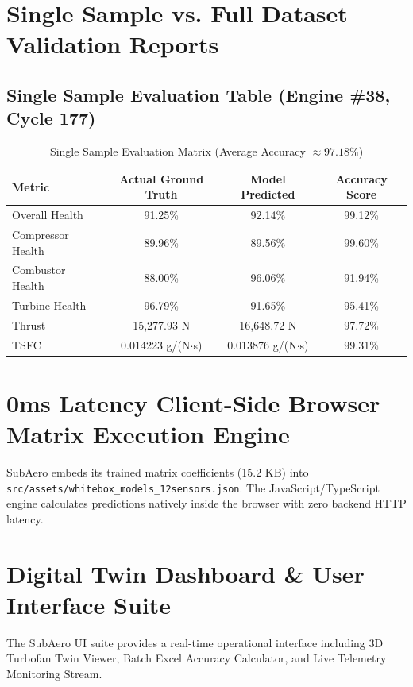 \documentclass[11pt,a4paper]{article}
\begin{document}
\section{Single Sample vs. Full Dataset Validation Reports}
\subsection{Single Sample Evaluation Table (Engine \#38, Cycle 177)}

\begin{table}[H]
\centering
\begin{tabular}{lccc}
\toprule
\textbf{Metric} & \textbf{Actual Ground Truth} & \textbf{Model Predicted} & \textbf{Accuracy Score} \\
\midrule
Overall Health & 91.25\% & 92.14\% & 99.12\% \\
Compressor Health & 89.96\% & 89.56\% & 99.60\% \\
Combustor Health & 88.00\% & 96.06\% & 91.94\% \\
Turbine Health & 96.79\% & 91.65\% & 95.41\% \\
Thrust & 15,277.93 N & 16,648.72 N & 97.72\% \\
TSFC & 0.014223 g/(N$\cdot$s) & 0.013876 g/(N$\cdot$s) & 99.31\% \\
\bottomrule
\end{tabular}
\caption{Single Sample Evaluation Matrix (Average Accuracy $\approx 97.18\%$)}
\end{table}

\section{0ms Latency Client-Side Browser Matrix Execution Engine}
SubAero embeds its trained matrix coefficients (15.2 KB) into \texttt{src/assets/whitebox\_models\_12sensors.json}. The JavaScript/TypeScript engine calculates predictions natively inside the browser with zero backend HTTP latency.

\section{Digital Twin Dashboard \& User Interface Suite}
The SubAero UI suite provides a real-time operational interface including 3D Turbofan Twin Viewer, Batch Excel Accuracy Calculator, and Live Telemetry Monitoring Stream.
\end{document}
